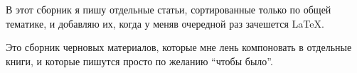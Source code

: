 
В этот сборник я пишу отдельные статьи, сортированные только по общей тематике,
и добавляю их, когда у меняв очередной раз зачешется \LaTeX.

Это сборник черновых материалов, которые мне лень компоновать в отдельные
книги, и которые пишутся просто по желанию ``чтобы было''.